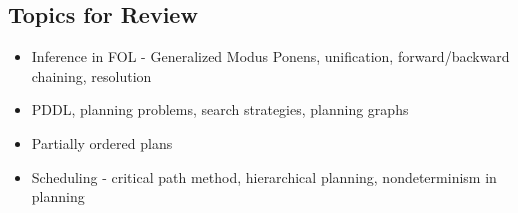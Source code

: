 \subsection*{Topics for Review}
\begin{itemize}
\item Inference in FOL - Generalized Modus Ponens, unification, forward/backward chaining, resolution
\item PDDL, planning problems, search strategies, planning graphs
\item Partially ordered plans
\item Scheduling - critical path method, hierarchical planning, nondeterminism in planning
\end{itemize}
